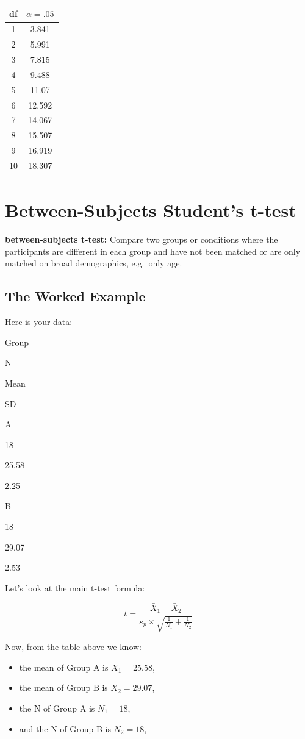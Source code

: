 \documentclass[
  oneside]{book}
\providecommand{\tightlist}{%
  \setlength{\itemsep}{0pt}\setlength{\parskip}{0pt}}
\begin{document}
\begin{longtable}[]{@{}cc@{}}
\toprule
df & \(\alpha = .05\) \\
\midrule
\endhead
1 & 3.841 \\
2 & 5.991 \\
3 & 7.815 \\
4 & 9.488 \\
5 & 11.07 \\
6 & 12.592 \\
7 & 14.067 \\
8 & 15.507 \\
9 & 16.919 \\
10 & 18.307 \\
\bottomrule
\end{longtable}

\hypertarget{between-subjects-students-t-test}{%
\chapter{Between-Subjects Student's t-test}\label{between-subjects-students-t-test}}

\textbf{between-subjects t-test:} Compare two groups or conditions where the participants are different in each group and have not been matched or are only matched on broad demographics, e.g.~only age.

\hypertarget{the-worked-example-2}{%
\section{The Worked Example}\label{the-worked-example-2}}

Here is your data:

Group

N

Mean

SD

A

18

25.58

2.25

B

18

29.07

2.53

Let's look at the main t-test formula:

\[t = \frac{\bar{X}_1 - \bar{X}_2}{s_p \times \sqrt{\frac{1}{N_1} + \frac{1}{N_2}}}\]

Now, from the table above we know:

\begin{itemize}
\tightlist
\item
  the mean of Group A is \(\bar{X_1} = 25.58\),
\item
  the mean of Group B is \(\bar{X_2} = 29.07\),
\item
  the N of Group A is \(N_1 = 18\),
\item
  and the N of Group B is \(N_2 = 18\),
\end{itemize}
\end{document}
